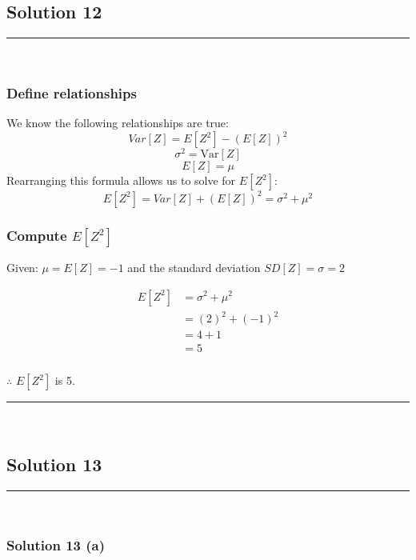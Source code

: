 \documentclass{article}
\begin{document}
\newpage
\subsection*{Solution 12}
\noindent\rule{\textwidth}{0.4pt}\\
\subsubsection*{Define relationships}

\parbox{\textwidth}{
We know the following relationships are true:
$$ Var[Z] = E[Z^2] - (E[Z])^2$$
$$\sigma^{2} = \text{Var}[Z]$$ 
$$E[Z] = \mu$$
Rearranging this formula allows us to solve for $E[Z^2]$:
$$ E[Z^2] = Var[Z] + (E[Z])^2 = \sigma^2 + \mu^2 $$

}
\subsubsection*{Compute $E[Z^{2}]$}
\parbox{\textwidth}{
Given: $\mu = E[Z] = -1$ and the standard deviation $SD[Z] = \sigma = 2$
}
\begin{align*}
E[Z^2] &= \sigma^2 + \mu^2 \\
&= (2)^2 + (-1)^2 \\
&= 4 + 1 \\
&= 5
\end{align*}

\subsubsection*{\normalfont}{$\therefore$ $E[Z^2]$ is 5.}

\noindent\rule{\textwidth}{0.4pt}\\

\newpage

\subsection*{Solution 13}
\noindent\rule{\textwidth}{0.4pt}\\
\subsubsection*{Solution  13 (a)}
\end{document}
